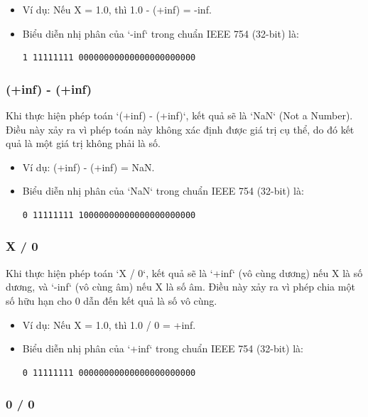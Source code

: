 \begin{itemize}
	\item Ví dụ: Nếu X = 1.0, thì 1.0 - (+inf) = -inf.
	\item Biểu diễn nhị phân của `-inf` trong chuẩn IEEE 754 (32-bit) là:
	      \begin{verbatim}
1 11111111 00000000000000000000000
\end{verbatim}
\end{itemize}

\subsubsection{(+inf) - (+inf)}

Khi thực hiện phép toán `(+inf) - (+inf)`, kết quả sẽ là `NaN` (Not a Number). Điều này xảy ra vì phép toán này không xác định được giá trị cụ thể, do đó kết quả là một giá trị không phải là số.

\begin{itemize}
	\item Ví dụ: (+inf) - (+inf) = NaN.
	\item Biểu diễn nhị phân của `NaN` trong chuẩn IEEE 754 (32-bit) là:
	      \begin{verbatim}
0 11111111 10000000000000000000000
\end{verbatim}
\end{itemize}

\subsubsection{X / 0}

Khi thực hiện phép toán `X / 0`, kết quả sẽ là `+inf` (vô cùng dương) nếu X là số dương, và `-inf` (vô cùng âm) nếu X là số âm. Điều này xảy ra vì phép chia một số hữu hạn cho 0 dẫn đến kết quả là số vô cùng.

\begin{itemize}
	\item Ví dụ: Nếu X = 1.0, thì 1.0 / 0 = +inf.
	\item Biểu diễn nhị phân của `+inf` trong chuẩn IEEE 754 (32-bit) là:
	      \begin{verbatim}
0 11111111 00000000000000000000000
\end{verbatim}
\end{itemize}

\subsubsection{0 / 0}

